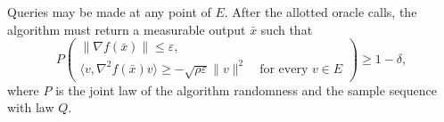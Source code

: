 \documentclass[10pt]{article}
\theoremstyle{definition}
\begin{document}
Queries may be made at any point of $E$. After the allotted oracle calls, the algorithm must return a measurable output $\bar{x}$ such that
\[
P\!\left(
\begin{gathered}
\|\nabla f(\bar{x})\|\leq\varepsilon,\\
\langle v,\nabla^2 f(\bar{x})v\rangle
\geq-\sqrt{\rho\varepsilon}\|v\|^2
\quad\text{for every }v\in E
\end{gathered}
\right)\geq1-\delta,
\]
where $P$ is the joint law of the algorithm randomness and the sample sequence with law $Q$.
\end{document}
